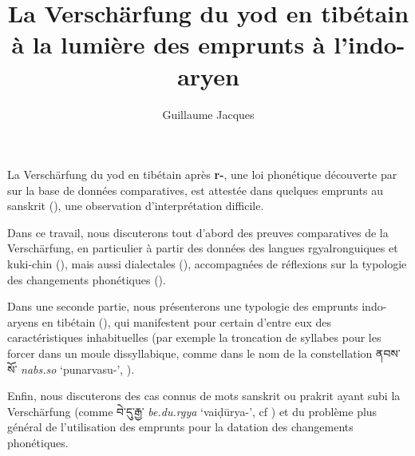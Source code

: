 \documentclass[oneside,a4paper,11pt]{article}
\newcommand{\ipa}[1]{\textbf{{\phon\mbox{#1}}}} %
\newcommand{\tibet}[3]{{\tibetain#1} \textit{\phon#2} `#3'}
\begin{document}
\title{La Verschärfung du yod en tibétain à la lumière des emprunts à l'indo-aryen}
\author{Guillaume Jacques}
\maketitle

La Verschärfung du yod en tibétain après \ipa{r-}, une loi phonétique découverte par \citet{lifk59globa} sur la base de données comparatives, est attestée dans quelques emprunts au sanskrit (\citealt{hill11laws}), une observation d'interprétation difficile.

Dans ce travail, nous discuterons tout d'abord des preuves comparatives de la Verschärfung, en particulier à partir des données des langues rgyalronguiques et kuki-chin (\citealt{jacques13yod}), mais aussi dialectales (\citealt{wangsc12anduo, gong16amdo}), accompagnées de réflexions sur la typologie des changements phonétiques (\citealt{gong16ld}).

Dans une seconde partie, nous présenterons une typologie des emprunts indo-aryens en tibétain (\citealt{laufer16loanwords, bielmeier07wortschatz}), qui manifestent pour certain d'entre eux des caractéristiques inhabituelles (par exemple la troncation de syllabes pour les forcer dans un moule dissyllabique, comme dans le nom de la constellation \tibet{ནབས་སོ་}{nabs.so}{punarvasu-},  \citealt{jacques07naksatram}).

Enfin, nous discuterons des cas connus de mots sanskrit ou prakrit ayant subi la Verschärfung (comme \tibet{བེ་དུ་རྒྱ་}{be.du.rgya}{vaiḍūrya-}, cf \citealt[36-37]{snellgrove67gzibrjid}) et du problème plus général de l'utilisation des emprunts pour la datation des changements phonétiques.



\end{document}
